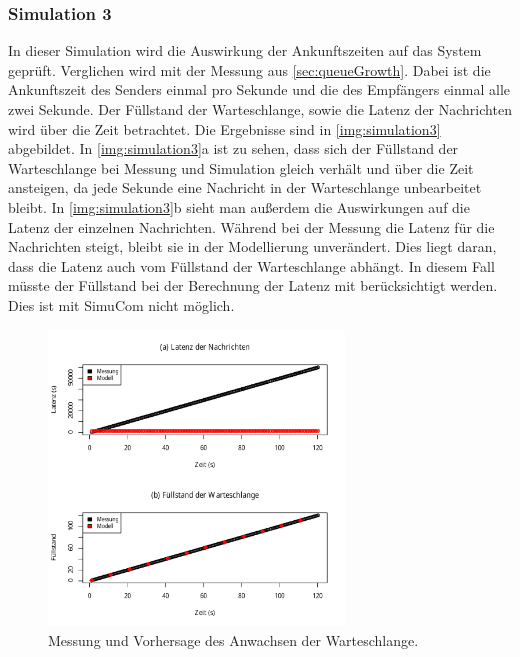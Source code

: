\subsubsection{Simulation 3}
\label{sec:simulation3}
In dieser Simulation wird die Auswirkung der Ankunftszeiten auf das System geprüft. Verglichen wird mit der Messung aus \autoref{sec:queueGrowth}. Dabei ist die Ankunftszeit des Senders einmal pro Sekunde und die des Empfängers einmal alle zwei Sekunde. Der Füllstand der Warteschlange, sowie die Latenz der Nachrichten wird über die Zeit betrachtet.
Die Ergebnisse sind in \autoref{img:simulation3} abgebildet. In \autoref{img:simulation3}a ist zu sehen, dass sich der Füllstand der Warteschlange bei Messung und Simulation gleich verhält und über die Zeit ansteigen, da jede Sekunde eine Nachricht in der Warteschlange unbearbeitet bleibt. In \autoref{img:simulation3}b sieht man außerdem die Auswirkungen auf die Latenz der einzelnen Nachrichten. Während bei der Messung die Latenz für die Nachrichten steigt, bleibt sie in der Modellierung unverändert. Dies liegt daran, dass die Latenz auch vom Füllstand der Warteschlange abhängt. In diesem Fall müsste der Füllstand bei der Berechnung der Latenz mit berücksichtigt werden. Dies ist mit SimuCom nicht möglich. 
\begin{figure}
\center
  \includegraphics[width=0.7\textwidth]{images/modelSimulationResults/simulation3.pdf}
  \caption{Messung und Vorhersage des Anwachsen der Warteschlange.}
  \label{img:simulation3}
\end{figure}

